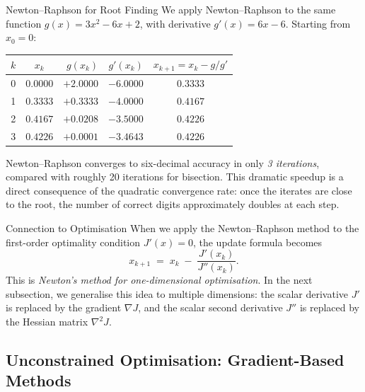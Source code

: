 \begin{examplebox}{Newton--Raphson for Root Finding}
	We apply Newton--Raphson to the same function $g(x)=3x^2-6x+2$, with derivative $g'(x)=6x-6$. Starting from $x_0=0$:

	\solution

	\begin{center}
	\renewcommand{\arraystretch}{1.15}
	\begin{tabular}{c c r r c}
		\toprule
		$k$ & $x_k$ & $g(x_k)$ & $g'(x_k)$ & $x_{k+1}=x_k - g/g'$ \\
		\midrule
		0 & $0.0000$ & $+2.0000$ & $-6.0000$ & $0.3333$ \\
		1 & $0.3333$ & $+0.3333$ & $-4.0000$ & $0.4167$ \\
		2 & $0.4167$ & $+0.0208$ & $-3.5000$ & $0.4226$ \\
		3 & $0.4226$ & $+0.0001$ & $-3.4643$ & $0.4226$ \\
		\bottomrule
	\end{tabular}
	\end{center}

	Newton--Raphson converges to six-decimal accuracy in only \emph{3 iterations}, compared with roughly 20 iterations for bisection. This dramatic speedup is a direct consequence of the quadratic convergence rate: once the iterates are close to the root, the number of correct digits approximately doubles at each step.
\end{examplebox}

\begin{notebox}{Connection to Optimisation}
	When we apply the Newton--Raphson method to the first-order optimality condition $J'(x)=0$, the update formula becomes
	\[
	x_{k+1} \;=\; x_k \;-\; \frac{J'(x_k)}{J''(x_k)}.
	\]
	This is \emph{Newton's method for one-dimensional optimisation}. In the next subsection, we generalise this idea to multiple dimensions: the scalar derivative $J'$ is replaced by the gradient $\nabla J$, and the scalar second derivative $J''$ is replaced by the Hessian matrix $\nabla^2 J$.
\end{notebox}



\subsection{Unconstrained Optimisation: Gradient-Based Methods}

